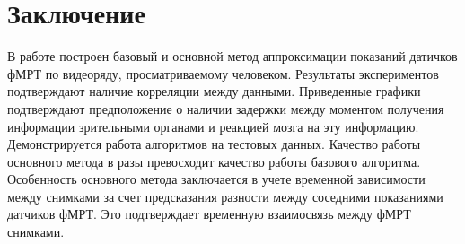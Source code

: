 \documentclass[12pt,twoside]{article}
\begin{document}
\section{Заключение}
В работе построен базовый и основной метод аппроксимации показаний датичков фМРТ по видеоряду, просматриваемому человеком. 
Результаты экспериментов подтверждают наличие корреляции между данными.
Приведенные графики подтверждают предположение о наличии задержки между моментом получения информации зрительными органами и реакцией мозга на эту информацию.
Демонстрируется работа алгоритмов на тестовых данных.
 Качество работы основного метода в разы превосходит качество работы базового алгоритма. 
 Особенность основного метода заключается в учете временной зависимости между снимками за счет предсказания разности между соседними показаниями датчиков фМРТ. 
Это подтверждает временную взаимосвязь между фМРТ снимками.
\newpage






\end{document}
